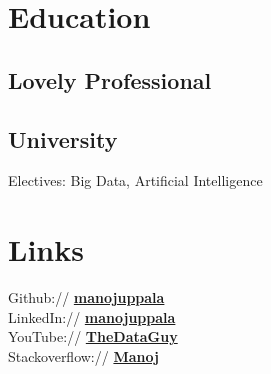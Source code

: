 \documentclass[]{manoj-resume}
\begin{document}
%
%
\lastupdated

%
%

%
%

\begin{minipage}[t]{0.33\textwidth} 


\section{Education} 

\subsection{Lovely Professional}
\subsection{University}
Electives: Big Data, Artificial Intelligence
\sectionsep


\section{Links} 
Github:// \href{https://github.com/manojuppala}{\bf manojuppala} \\
LinkedIn://  \href{https://www.linkedin.com/in/manojuppala/}{\bf manojuppala} \\
YouTube://  \href{https://www.youtube.com/thedataguy}{\bf TheDataGuy} \\
Stackoverflow://  \href{https://stackoverflow.com/users/11874811/manoj}{\bf Manoj} \\


\end{minipage}
\end{document}
